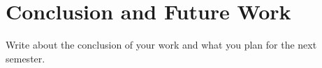 \chapter{Conclusion and Future Work}
Write about the conclusion of your work and what you plan for the next semester.



